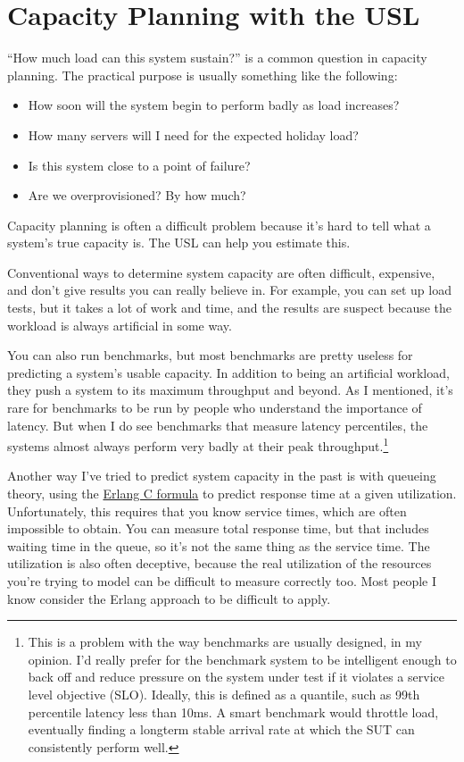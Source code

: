 \documentclass{vivid_layout}
\begin{document}
\newpage
\section{Capacity Planning with the USL}

``How much load can this system sustain?'' is a common question in capacity
planning. The practical purpose is usually something like the following:

\begin{itemize}
\item How soon will the system begin to perform badly as load increases?
\item How many servers will I need for the expected holiday load?
\item Is this system close to a point of failure?
\item Are we overprovisioned? By how much?
\end{itemize}

Capacity planning is often a difficult problem because it's hard to tell what a
system's true capacity is. The USL can help you estimate this.

Conventional ways to determine system capacity are often difficult, expensive,
and don't give results you can really believe in. For example, you can set up
load tests, but it takes a lot of work and time, and the results are suspect
because the workload is always artificial in some way.

You can also run benchmarks, but most benchmarks are pretty useless for
predicting a system's usable capacity. In addition to being an artificial
workload, they push a system to its maximum throughput and beyond. As I
mentioned, it's rare for benchmarks to be run by people who understand the
importance of latency. But when I do see benchmarks that measure latency
percentiles, the systems almost always perform very badly at their peak
throughput.\footnote{This is a problem with the way benchmarks are usually
designed, in my opinion. I'd really prefer for the benchmark system to be
intelligent enough to back off and reduce pressure on the system under test if
it violates a service level objective (SLO).  Ideally, this is defined as a
quantile, such as 99th percentile latency less than 10ms.  A smart benchmark
would throttle load, eventually finding a longterm stable arrival rate at which
the SUT can consistently perform well.}

Another way I've tried to predict system capacity in the past is with queueing
theory, using the
\href{https://en.wikipedia.org/wiki/Erlang\_(unit)#Erlang\_C\_formula}{Erlang C
formula} to predict response time at a given utilization.  Unfortunately, this
requires that you know service times, which are often impossible to obtain. You
can measure total response time, but that includes waiting time in the queue, so
it's not the same thing as the service time. The utilization is also often
deceptive, because the real utilization of the resources you're trying to model
can be difficult to measure correctly too. Most people I know consider the
Erlang approach to be difficult to apply.
\end{document}
